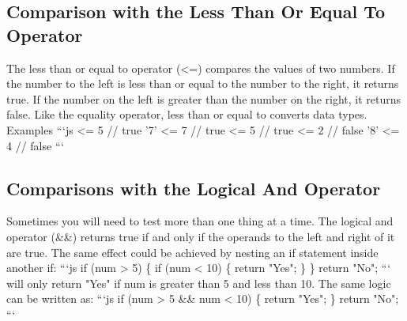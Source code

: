 \documentclass{article}%
\begin{document}
\subsection{Comparison with the Less Than Or Equal To Operator}%
\label{subsec:ComparisonwiththeLessThanOrEqualToOperator}%
The less than or equal to operator (<=) compares the values of two numbers. If the number to the left is less than or equal to the number to the right, it returns true. If the number on the left is greater than the number on the right, it returns false. Like the equality operator, less than or equal to converts data types.\newline%
Examples\newline%
```js   <= 5  // true\newline%
'7' <= 7  // true   <= 5  // true   <= 2  // false\newline%
'8' <= 4  // false\newline%
```\newline%

%
\subsection{Comparisons with the Logical And Operator}%
\label{subsec:ComparisonswiththeLogicalAndOperator}%
Sometimes you will need to test more than one thing at a time. The logical and operator (\&\&) returns true if and only if the operands to the left and right of it are true.\newline%
The same effect could be achieved by nesting an if statement inside another if:\newline%
```js\newline%
if (num > 5) \{\newline%
  if (num < 10) \{\newline%
    return "Yes";\newline%
  \}\newline%
\}\newline%
return "No";\newline%
```\newline%
will only return "Yes" if num is greater than 5 and less than 10. The same logic can be written as:\newline%
```js\newline%
if (num > 5 \&\& num < 10) \{\newline%
  return "Yes";\newline%
\}\newline%
return "No";\newline%
```\newline%
\end{document}
